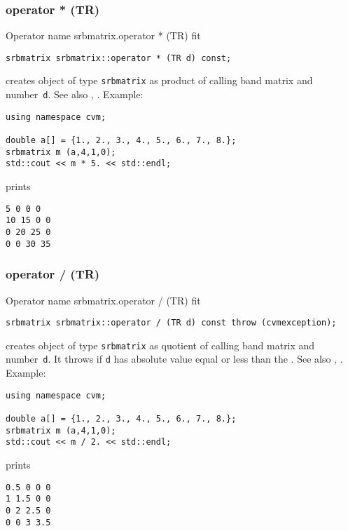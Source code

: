 \subsubsection{operator * (TR)}
Operator%
\pdfdest name {srbmatrix.operator * (TR)} fit
\begin{verbatim}
srbmatrix srbmatrix::operator * (TR d) const;
\end{verbatim}
creates  object of type \verb"srbmatrix" as  product of
 calling band matrix and  number~\verb"d".
See also ,
.
Example:
\begin{Verbatim}
using namespace cvm;

double a[] = {1., 2., 3., 4., 5., 6., 7., 8.};
srbmatrix m (a,4,1,0);
std::cout << m * 5. << std::endl;
\end{Verbatim}
prints
\begin{Verbatim}
5 0 0 0
10 15 0 0
0 20 25 0
0 0 30 35
\end{Verbatim}
\newpage



\subsubsection{operator / (TR)}
Operator%
\pdfdest name {srbmatrix.operator / (TR)} fit
\begin{verbatim}
srbmatrix srbmatrix::operator / (TR d) const throw (cvmexception);
\end{verbatim}
creates  object of type \verb"srbmatrix" as  quotient of
 calling band matrix and  number~\verb"d". It throws
if \verb"d" has  absolute value equal or less than the
.
See also ,
.
Example:
\begin{Verbatim}
using namespace cvm;

double a[] = {1., 2., 3., 4., 5., 6., 7., 8.};
srbmatrix m (a,4,1,0);
std::cout << m / 2. << std::endl;
\end{Verbatim}
prints
\begin{Verbatim}
0.5 0 0 0
1 1.5 0 0
0 2 2.5 0
0 0 3 3.5
\end{Verbatim}
\newpage



